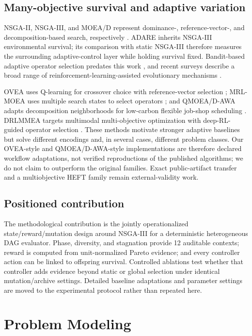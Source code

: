 \documentclass[preprint,12pt]{elsarticle}
\begin{document}
\subsection{Many-objective survival and adaptive variation}
NSGA-II, NSGA-III, and MOEA/D represent dominance-, reference-vector-, and decomposition-based search, respectively \cite{deb2002nsga2,deb2014nsga3,zhang2007moead}. ADARE inherits NSGA-III environmental survival; its comparison with static NSGA-III therefore measures the surrounding adaptive-control layer while holding survival fixed. Bandit-based adaptive operator selection predates this work \cite{dacosta2008aos,fialho2010aos}, and recent surveys describe a broad range of reinforcement-learning-assisted evolutionary mechanisms \cite{song2024survey}.

OVEA uses Q-learning for crossover choice with reference-vector selection \cite{jiao2023ovea}; MRL-MOEA uses multiple search states to select operators \cite{wang2025mrlmoea}; and QMOEA/D-AWA adapts decomposition neighborhoods for low-carbon flexible job-shop scheduling \cite{wang2026qmoeadawa}. DRLMMEA targets multimodal multi-objective optimization with deep-RL-guided operator selection \cite{cui2026drlmmea}. These methods motivate stronger adaptive baselines but solve different encodings and, in several cases, different problem classes. Our OVEA-style and QMOEA/D-AWA-style implementations are therefore declared workflow adaptations, not verified reproductions of the published algorithms; we do not claim to outperform the original families. Exact public-artifact transfer and a multiobjective HEFT family remain external-validity work.

\subsection{Positioned contribution}
The methodological contribution is the jointly operationalized state/reward/mutation design around NSGA-III for a deterministic heterogeneous DAG evaluator. Phase, diversity, and stagnation provide 12 auditable contexts; reward is computed from unit-normalized Pareto evidence; and every controller action can be linked to offspring survival. Controlled ablations test whether that controller adds evidence beyond static or global selection under identical mutation/archive settings. Detailed baseline adaptations and parameter settings are moved to the experimental protocol rather than repeated here.

\section{Problem Modeling}
\end{document}

